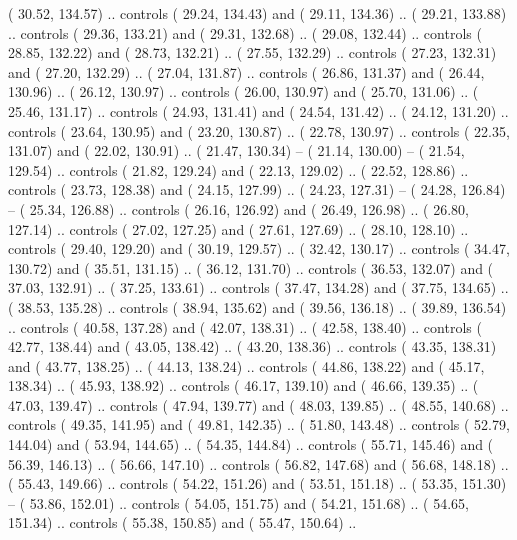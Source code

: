 {        (  30.52, 134.57) .. controls (  29.24, 134.43) and (  29.11, 134.36) ..
        (  29.21, 133.88) .. controls (  29.36, 133.21) and (  29.31, 132.68) ..
        (  29.08, 132.44) .. controls (  28.85, 132.22) and (  28.73, 132.21) ..
        (  27.55, 132.29) .. controls (  27.23, 132.31) and (  27.20, 132.29) ..
        (  27.04, 131.87) .. controls (  26.86, 131.37) and (  26.44, 130.96) ..
        (  26.12, 130.97) .. controls (  26.00, 130.97) and (  25.70, 131.06) ..
        (  25.46, 131.17) .. controls (  24.93, 131.41) and (  24.54, 131.42) ..
        (  24.12, 131.20) .. controls (  23.64, 130.95) and (  23.20, 130.87) ..
        (  22.78, 130.97) .. controls (  22.35, 131.07) and (  22.02, 130.91) ..
        (  21.47, 130.34) -- 
        (  21.14, 130.00) -- 
        (  21.54, 129.54) .. controls (  21.82, 129.24) and (  22.13, 129.02) ..
        (  22.52, 128.86) .. controls (  23.73, 128.38) and (  24.15, 127.99) ..
        (  24.23, 127.31) -- 
        (  24.28, 126.84) -- 
        (  25.34, 126.88) .. controls (  26.16, 126.92) and (  26.49, 126.98) ..
        (  26.80, 127.14) .. controls (  27.02, 127.25) and (  27.61, 127.69) ..
        (  28.10, 128.10) .. controls (  29.40, 129.20) and (  30.19, 129.57) ..
        (  32.42, 130.17) .. controls (  34.47, 130.72) and (  35.51, 131.15) ..
        (  36.12, 131.70) .. controls (  36.53, 132.07) and (  37.03, 132.91) ..
        (  37.25, 133.61) .. controls (  37.47, 134.28) and (  37.75, 134.65) ..
        (  38.53, 135.28) .. controls (  38.94, 135.62) and (  39.56, 136.18) ..
        (  39.89, 136.54) .. controls (  40.58, 137.28) and (  42.07, 138.31) ..
        (  42.58, 138.40) .. controls (  42.77, 138.44) and (  43.05, 138.42) ..
        (  43.20, 138.36) .. controls (  43.35, 138.31) and (  43.77, 138.25) ..
        (  44.13, 138.24) .. controls (  44.86, 138.22) and (  45.17, 138.34) ..
        (  45.93, 138.92) .. controls (  46.17, 139.10) and (  46.66, 139.35) ..
        (  47.03, 139.47) .. controls (  47.94, 139.77) and (  48.03, 139.85) ..
        (  48.55, 140.68) .. controls (  49.35, 141.95) and (  49.81, 142.35) ..
        (  51.80, 143.48) .. controls (  52.79, 144.04) and (  53.94, 144.65) ..
        (  54.35, 144.84) .. controls (  55.71, 145.46) and (  56.39, 146.13) ..
        (  56.66, 147.10) .. controls (  56.82, 147.68) and (  56.68, 148.18) ..
        (  55.43, 149.66) .. controls (  54.22, 151.26) and (  53.51, 151.18) ..
        (  53.35, 151.30) -- 
        (  53.86, 152.01) .. controls (  54.05, 151.75) and (  54.21, 151.68) ..
        (  54.65, 151.34) .. controls (  55.38, 150.85) and (  55.47, 150.64) ..
}
